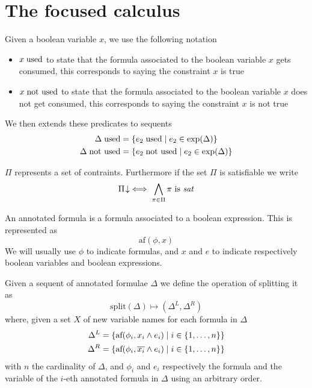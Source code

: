 \documentclass[a4paper, 12pt, tesi, english]{report}
\begin{document}
\chapter{The focused calculus}

\begin{define}
	Given a boolean variable $x$, we use the following notation
	\begin{itemize}
		\item $x \; \text{used}$ to state that the formula associated to the boolean variable $x$ gets consumed, this corresponds to saying the constraint $x$ is true
		\item $x \; \text{not used}$ to state that the formula associated to the boolean variable $x$ does not get consumed, this corresponds to saying the constraint $x$ is not true
	\end{itemize}
	We then extends these predicates to sequents
	\begin{align*}
		\Delta \; \text{used} &= \{ e_2 \; \text{used} \mid e_2 \in \text{exp}(\Delta) \} \\
		\Delta \; \text{not used} &= \{ e_2 \; \text{not used} \mid e_2 \in \text{exp}(\Delta) \}
	\end{align*}
\end{define}

\begin{define}
	$\Pi$ represents a set of contraints.
	Furthermore if the set $\Pi$ is satisfiable we write
	$$ \Pi\!\downarrow \;\Longleftrightarrow\; \bigwedge_{\pi \in \Pi} \pi \text{ is \textit{sat}} $$
\end{define}

\begin{define}
	An annotated formula is a formula associated to a boolean expression.
	This is represented as
	$$ \text{af}(\phi, x) $$
	We will usually use $\phi$ to indicate formulas, and $x$ and $e$ to indicate respectively boolean variables and boolean expressions.
\end{define}

\begin{define}
	Given a sequent of annotated formulae $\Delta$ we define the operation of splitting it as
	$$ \text{split}(\Delta) \mapsto (\Delta^L, \Delta^R) $$
	where, given a set $X$ of new variable names for each formula in $\Delta$
	\begin{align*}
		\Delta^L &= \{ \text{af}(\phi_i, x_i \wedge e_i) \mid i \in \{1, \dots, n\}\} \\
		\Delta^R &= \{ \text{af}(\phi_i, \overline{x_i} \wedge e_i) \mid i \in \{1, \dots, n\}\} \\
	\end{align*}
	with $n$ the cardinality of $\Delta$, and $\phi_i$ and $e_i$ respectively the formula and the variable of the $i$-eth annotated formula in $\Delta$ using an arbitrary order.
\end{define}
\end{document}
